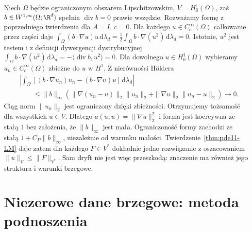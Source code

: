 \begin{przyklad}
\label{ex:pde11-divfree-drift}
Niech $\Omega$ będzie ograniczonym obszarem
Lipschitzowskim, $V=H_0^1(\Omega)$, zaś
$b\in W^{1,\infty}(\Omega;\R^d)$ spełnia
$\operatorname{div}b=0$ prawie wszędzie.
Rozważamy formę z poprzedniego twierdzenia
dla $A=I$, $c=0$. Dla każdego $u\in C_c^\infty(\Omega)$
całkowanie przez części daje
$\int_\Omega(b\cdot\nabla u)u\,\mathrm d\lambda_d
=\frac12\int_\Omega b\cdot\nabla(u^2)\,\mathrm d\lambda_d=0$.
Istotnie, $u^2$ jest testem i z definicji
dywergencji dystrybucyjnej
$\int_\Omega b\cdot\nabla(u^2)\,\mathrm d\lambda_d
=-\langle\operatorname{div}b,u^2\rangle=0$.
Dla dowolnego $u\in H_0^1(\Omega)$ wybieramy
$u_n\in C_c^\infty(\Omega)$ zbieżne do $u$ w $H^1$.
Z nierówności Höldera
\[
 \begin{aligned}
 &\left|\int_\Omega
 [(b\cdot\nabla u_n)u_n-(b\cdot\nabla u)u]
               \,\mathrm d\lambda_d\right|\\
 &\qquad\le\|b\|_\infty
 (\|\nabla(u_n-u)\|_2\|u_n\|_2
   +\|\nabla u\|_2\|u_n-u\|_2)\longrightarrow0.
 \end{aligned}
\]
Ciąg norm $\|u_n\|_2$ jest ograniczony dzięki zbieżności.
Otrzymujemy tożsamość dla wszystkich $u\in V$. Dlatego
$a(u,u)=\|\nabla u\|_2^2$ i forma jest koercywna
ze stałą $1$ bez założenia, że $\|b\|_\infty$ jest mała.
Ograniczoność formy zachodzi ze stałą
$1+C_P\|b\|_\infty$, niezależnie od warunku małości.
Twierdzenie~\ref{thm:pde11-LM} daje zatem dla
każdego $F\in V^*$ dokładnie jedno rozwiązanie
z oszacowaniem $\|u\|_V\le\|F\|_{V^*}$.
Sam dryft nie jest więc przeszkodą: znaczenie ma również
jego struktura i warunki brzegowe.
\end{przyklad}

\section{Niezerowe dane brzegowe: metoda podnoszenia}
\label{sec:pde11-lifting}

